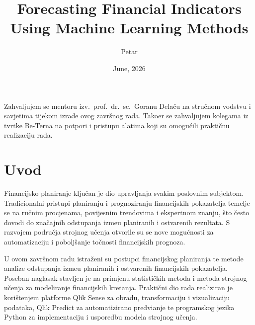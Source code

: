 \documentclass[zavrsnirad]{fer}
\title{Forecasting Financial Indicators Using Machine Learning Methods}
\author{Petar}
\date{June, 2026}
\begin{document}
\maketitle


\begin{zahvale}
  Zahvaljujem se mentoru izv.\ prof.\ dr.\ sc.\ Goranu Dela\v{c}u na stru\v{c}nom vodstvu i savjetima tijekom izrade ovog zavr\v{s}nog rada. Tako\dj er se zahvaljujem kolegama iz tvrtke Be-Terna na potpori i pristupu alatima koji su omogu\'{c}ili prakti\v{c}nu realizaciju rada.
\end{zahvale}

\mainmatter

\tableofcontents


\chapter{Uvod}
\label{pog:uvod}

Financijsko planiranje klju\v{c}an je dio upravljanja svakim poslovnim subjektom. Tradicionalni pristupi planiranju i prognoziranju financijskih pokazatelja temelje se na ru\v{c}nim procjenama, povijesnim trendovima i ekspertnom znanju, \v{s}to \v{c}esto dovodi do zna\v{c}ajnih odstupanja izme\dj u planiranih i ostvarenih rezultata. S razvojem podru\v{c}ja strojnog u\v{c}enja otvorile su se nove mogu\'{c}nosti za automatizaciju i pobolj\v{s}anje to\v{c}nosti financijskih prognoza.

U ovom zavr\v{s}nom radu istra\v{z}eni su postupci financijskog planiranja te metode analize odstupanja izme\dj u planiranih i ostvarenih financijskih pokazatelja. Poseban naglasak stavljen je na primjenu statisti\v{c}kih metoda i metoda strojnog u\v{c}enja za modeliranje financijskih kretanja. Prakti\v{c}ni dio rada realiziran je kori\v{s}tenjem platforme Qlik Sense za obradu, transformaciju i vizualizaciju podataka, Qlik Predict za automatizirano predvi\dj anje te programskog jezika Python za implementaciju i usporedbu modela strojnog u\v{c}enja.
\end{document}
